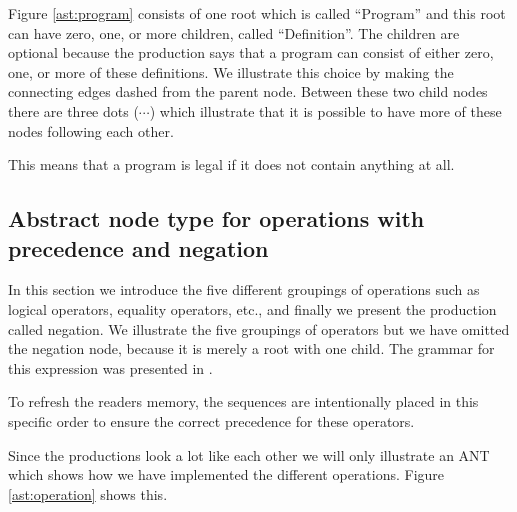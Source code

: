 

Figure \ref{ast:program} consists of one root which is called ``Program'' and
this root can have zero, one, or more children, called ``Definition''. The
children are optional because the production says that a program can consist of
either zero, one, or more of these definitions. We illustrate this choice by
making the connecting edges dashed from the parent node. Between these two child
nodes there are three dots ($\cdots$) which illustrate that it is possible to
have more of these nodes following each other.

This means that a program is legal if it does not contain anything at all.

\subsection{Abstract node type for operations with precedence and negation}
In this section we introduce the five different groupings of operations such as
logical operators, equality operators, etc., and finally we present the
production called negation. We illustrate the five groupings of operators but we
have omitted the negation node, because it is merely a root with one child. The
grammar for this expression was presented in .


To refresh the readers memory, the sequences are intentionally placed in this
specific order to ensure the correct precedence for these operators.

Since the productions look a lot like each other we will only illustrate an
ANT which shows how we have implemented the different operations.
Figure \ref{ast:operation} shows this.



